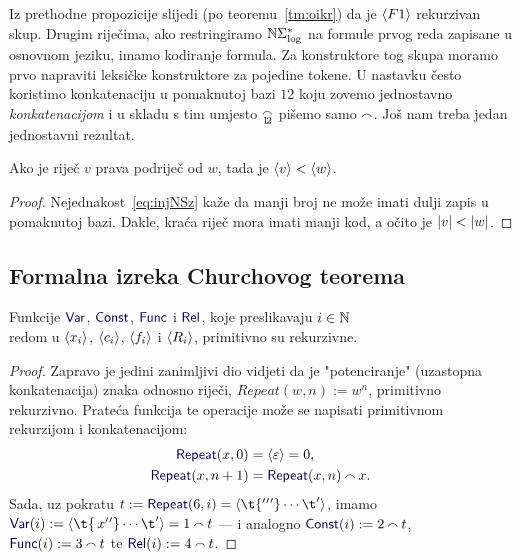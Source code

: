 Iz prethodne propozicije slijedi (po teoremu~\ref{tm:oikr}) da je $\langle F1\rangle$ rekurzivan skup. Drugim riječima, ako restringiramo ${\mathbb N}\Sigma_{\log}^*$ na formule prvog reda zapisane u osnovnom jeziku, imamo kodiranje formula. Za konstruktore tog skupa moramo prvo napraviti leksičke konstruktore za pojedine tokene. U nastavku često koristimo konkatenaciju u pomaknutoj bazi $12$ koju zovemo jednostavno \emph{konkatenacijom} i u skladu s tim umjesto $\conc{1\!2}$ pišemo samo $\conc{}$. Još nam treba jedan jednostavni rezultat.

\begin{korolar}[{name=[(prava) podriječ ima (strogo) manji kod]}]\label{kor:krvw}
Ako je riječ $v$ prava podriječ od $w$, tada je $\langle v\rangle<\langle w\rangle$.
\end{korolar}
\begin{proof}
    Nejednakost~\eqref{eq:injNSz} kaže da manji broj ne može imati dulji zapis u pomaknutoj bazi. Dakle, kraća riječ mora imati manji kod, a očito je $\lvert v\rvert<\lvert w\rvert$.
\end{proof}

\subsection{Formalna izreka Churchovog teorema}

\begin{lema}[{name=[primitivna rekurzivnost leksičke strukture formula prvog reda]}]\label{lm:lexF1}
Funkcije $\f{Var}$, $\f{Const}$, $\f{Func}$ i $\f{Rel}$, koje preslikavaju $i\in{\mathbb N}$\\ redom u $\langle x_i\rangle$, $\langle c_i\rangle$, $\langle f_i\rangle$ i $\langle R_i\rangle$, primitivno su rekurzivne.
\end{lema}
\begin{proof}
Zapravo je jedini zanimljivi dio vidjeti da je "potenciranje" (uzastopna konkatenacija) znaka odnosno riječi, $Repeat(w,n):=w^n$, primitivno rekurzivno. Prateća funkcija te operacije može se napisati primitivnom rekurzijom i konkatenacijom:
\begin{align}
    \f{Repeat}(x,0)&=\kr{\varepsilon}=0\text,\\
    \f{Repeat}(x,n+1)&=\f{Repeat}(x,n)\conc{}x\text.
\end{align}
    Sada, uz pokratu $t:=\f{Repeat}(6,i)=\kr{\t{'{}'{}'}\dotsm\t'}$, imamo $\f{Var}(i):=\kr{\t{\,x{}'{}'}\dotsm\t'}=1\conc{}t$ --- i analogno $\f{Const}(i):=2\conc{}t$, $\f{Func}(i):=3\conc{}t$ te $\f{Rel}(i):=4\conc{}t$.
\end{proof}

